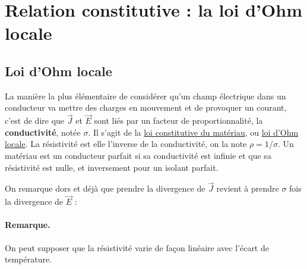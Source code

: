 \documentclass[12pt]{book}
\begin{document}

\section{Relation constitutive : la loi d'Ohm locale}
\subsection{Loi d'Ohm locale}
La manière la plus élémentaire de considérer qu'un champ électrique dans un conducteur va mettre des charges en mouvement et de provoquer un courant, c'est de dire que $\vec{J}$ et $\vec{E}$ sont liés par un facteur de proportionnalité, la \textbf{conductivité}, notée $\sigma$. Il s'agit de la \underline{loi constitutive du matériau}, ou \underline{loi d'Ohm locale}. La résistivité est elle l'inverse de la conductivité, on la note $\rho = 1/\sigma$. Un matériau est un conducteur parfait si sa conductivité est infinie et que sa résistivité est nulle, et inversement pour un isolant parfait.


On remarque dors et déjà que prendre la divergence de $\vec{J}$ revient à prendre $\sigma$ fois la divergence de $\vec{E}$ :

\paragraph{Remarque.} On peut supposer que la résistivité varie de façon linéaire avec l'écart de température.
\end{document}
